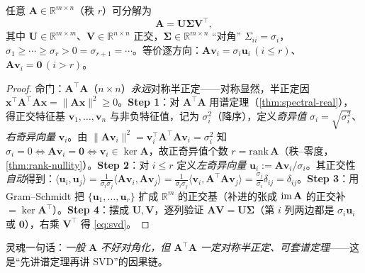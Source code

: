\begin{theorem}\label{thm:svd}
任意 $\mathbf{A}\in\mathbb{R}^{m\times n}$（秩 $r$）可分解为
\begin{equation}
  \mathbf{A}=\mathbf{U}\boldsymbol{\Sigma}\mathbf{V}^\top,
  \label{eq:svd}
\end{equation}
其中 $\mathbf{U}\in\mathbb{R}^{m\times m}$、$\mathbf{V}\in\mathbb{R}^{n\times n}$ 正交，$\boldsymbol{\Sigma}\in\mathbb{R}^{m\times n}$ “对角” $\Sigma_{ii}=\sigma_i$，$\sigma_1\ge\cdots\ge\sigma_r>0=\sigma_{r+1}=\cdots$。等价逐方向：$\mathbf{A}\mathbf{v}_i=\sigma_i\mathbf{u}_i\,(i\le r)$、$\mathbf{A}\mathbf{v}_i=\mathbf{0}\,(i>r)$。
\end{theorem}
\begin{proof}
命门：$\mathbf{A}^\top\mathbf{A}$（$n\times n$）\emph{永远}对称半正定——对称显然，半正定因 $\mathbf{x}^\top\mathbf{A}^\top\mathbf{A}\mathbf{x}=\|\mathbf{A}\mathbf{x}\|^2\ge0$。\textbf{Step 1}：对 $\mathbf{A}^\top\mathbf{A}$ 用谱定理（\cref{thm:spectral-real}），得正交特征基 $\mathbf{v}_1,\dots,\mathbf{v}_n$ 与非负特征值，记为 $\sigma_i^2$（降序），定义\emph{奇异值} $\sigma_i=\sqrt{\sigma_i^2}$、\emph{右奇异向量} $\mathbf{v}_i$。由 $\|\mathbf{A}\mathbf{v}_i\|^2=\mathbf{v}_i^\top\mathbf{A}^\top\mathbf{A}\mathbf{v}_i=\sigma_i^2$ 知 $\sigma_i=0\iff\mathbf{A}\mathbf{v}_i=\mathbf{0}\iff\mathbf{v}_i\in\ker\mathbf{A}$，故正奇异值个数 $r=\mathrm{rank}\,\mathbf{A}$（秩--零度，\cref{thm:rank-nullity}）。\textbf{Step 2}：对 $i\le r$ 定义\emph{左奇异向量} $\mathbf{u}_i:=\mathbf{A}\mathbf{v}_i/\sigma_i$。其正交性\emph{自动}得到：$\langle\mathbf{u}_i,\mathbf{u}_j\rangle=\frac{1}{\sigma_i\sigma_j}\langle\mathbf{A}\mathbf{v}_i,\mathbf{A}\mathbf{v}_j\rangle=\frac{1}{\sigma_i\sigma_j}\langle\mathbf{v}_i,\mathbf{A}^\top\mathbf{A}\mathbf{v}_j\rangle=\frac{\sigma_j}{\sigma_i}\delta_{ij}=\delta_{ij}$。\textbf{Step 3}：用 Gram--Schmidt 把 $\{\mathbf{u}_1,\dots,\mathbf{u}_r\}$ 扩成 $\mathbb{R}^m$ 的正交基（补进的张成 $\operatorname{im}\mathbf{A}$ 的正交补 $=\ker\mathbf{A}^\top$）。\textbf{Step 4}：摆成 $\mathbf{U},\mathbf{V}$，逐列验证 $\mathbf{A}\mathbf{V}=\mathbf{U}\boldsymbol{\Sigma}$（第 $i$ 列两边都是 $\sigma_i\mathbf{u}_i$ 或 $\mathbf{0}$），右乘 $\mathbf{V}^\top$ 得 \cref{eq:svd}。
\end{proof}

\noindent 灵魂一句话：\emph{一般 $\mathbf{A}$ 不好对角化，但 $\mathbf{A}^\top\mathbf{A}$ 一定对称半正定、可套谱定理}——这是“先讲谱定理再讲 SVD”的因果链。

